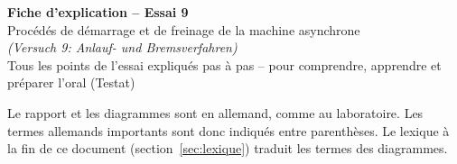 \documentclass[11pt,a4paper]{article}
\begin{document}
\sloppy
\begin{center}
{\LARGE\bfseries Fiche d'explication -- Essai 9}\\[4pt]
{\Large Procédés de démarrage et de freinage de la machine asynchrone}\\[2pt]
{\normalsize\itshape (Versuch 9: Anlauf- und Bremsverfahren)}\\[6pt]
{\normalsize Tous les points de l'essai expliqués pas à pas -- pour comprendre, apprendre et préparer l'oral (Testat)}
\end{center}

\begin{achtung}
Le rapport et les diagrammes sont en allemand, comme au laboratoire. Les termes allemands
importants sont donc indiqués entre parenthèses. Le lexique à la fin de ce document (section~\ref{sec:lexique}) traduit les termes des diagrammes.
\end{achtung}

\tableofcontents
\newpage

\end{document}
